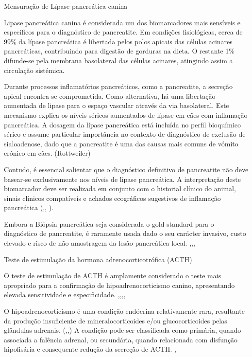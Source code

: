 Mensuração de Lípase pancreática canina

Lipase pancreática canina é considerada um dos biomarcadores mais sensíveis e específicos para o diagnóstico de pancreatite. \cite{Kim2024} Em condições fisiológicas, cerca de 99\% da lípase pancreática é libertada pelos polos apicais das células acinares pancreáticas, contribuindo para digestão de gorduras na dieta. \cite{Lim2022} O restante 1\% difunde-se pela membrana basolateral das células acinares, atingindo assim a circulação sistémica.\cite{Lim2022}


Durante processos inflamatórios pancreáticos, como a pancreatite, a secreção apical encontra-se comprometida. Como alternativa, há uma libertação aumentada de lipase para o espaço vascular através da via basolateral. \cite{Lim2022} Este mecanismo explica os níveis séricos aumentados de lípase em cães com inflamação pancreática.
A dosagem da lípase pancreática está incluída no perfil bioquímico sérico e assume particular importância no contexto de diagnóstico de exclusão de sialoadenose, dado que a pancreatite é uma das causas mais comuns de vómito crónico em cães. (Rottweiler) 


Contudo, é essencial salientar que o diagnóstico definitivo de pancreatite não deve basear-se exclusivamente nos níveis de lipase pancreática. A interpretação deste biomarcador deve ser realizada em conjunto com o historial clínico do animal, sinais clínicos compatíveis e achados ecográficos sugestivos de inflamação pancreática (\cite{Cridge2021},\cite{Kim2024}, \cite{Lim2022}).


Embora a Biópsia pancreática seja considerada o gold standard para o diagnóstico de pancreatite, é raramente usada dado o seu carácter invasivo, custo elevado e risco de não amostragem da lesão pancreática local. \cite{Cridge2021},\cite{Kim2024},\cite{Lim2022}, \cite{Liu2025}


Teste de estimulação da hormona adrenocorticotrófica (ACTH)


O teste de estimulação de ACTH é amplamente considerado o teste mais apropriado para a confirmação de hipoadrenocorticismo canino, apresentando elevada sensitividade e especificidade. \cite{s40},\cite{Wakayama2017},\cite{Botsford2018},\cite{Spence2018},\cite{Mooney2023}


O hipoadrenocorticismo é uma condição endócrina relativamente rara, resultante da produção insuficiente de mineralocorticoides e/ou glucocorticoides pelas glândulas adrenais. (\cite{s40},\cite{Wakayama2017},\cite{Mooney2023}) A condição pode ser classificada como primária, quando associada a falência adrenal, ou secundária, quando relacionada com disfunção hipofisária e consequente redução da secreção de ACTH. \cite{Botsford2018},\cite{Mooney2023}


